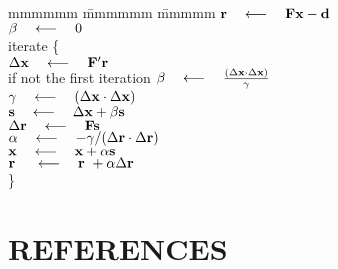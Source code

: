 \label{'cgtemplate'}
\begin{tabbing}
mmmmmm \= mmmmmm \= mmmmm \kill
\> $\bold r \quad\longleftarrow\quad \bold F \bold x - \bold d$ \\
\> $\beta \quad\longleftarrow\quad 0$ \\
\> {\rm iterate \{ }                                               \\
\>      \>  $\Delta \bold x   \quad\longleftarrow\quad \bold F' \bold r$          \\
\>      \>  {\rm if not the first iteration} 
$\beta \quad\longleftarrow\quad \frac{ (\Delta \bold x \cdot \Delta \bold x )}
                            { \gamma}$                              \\
\>      \>  $\gamma \quad\longleftarrow\quad (\Delta \bold x \cdot \Delta \bold x )$ \\
\>      \>  $\bold s   \quad\longleftarrow\quad \Delta \bold x + \beta \bold s$      \\
\>      \>  $\Delta \bold r  \quad\longleftarrow\quad \bold F \bold  s$               \\
\>      \> $\alpha \quad\longleftarrow\quad
                - \gamma/
                 (\Delta \bold r \cdot \Delta\bold r )
                $
                \\
\>      \> $\bold x   \quad\longleftarrow\quad \bold x   + \alpha\bold s$              \\
\>      \> $\bold r\  \quad\longleftarrow\quad \bold r\  + \alpha\Delta \bold r$       \\
\>      \> \}                                                   
\end{tabbing}

%
%

\section{REFERENCES}

